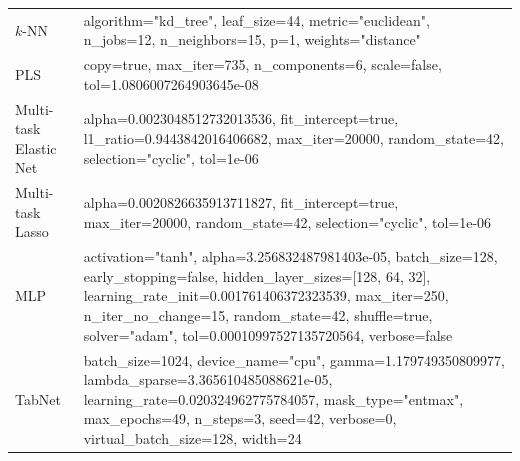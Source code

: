 \begin{longtable}{p{3.2cm}p{11.5cm}}
$k$-NN & algorithm="kd\_tree", leaf\_size=44, metric="euclidean", n\_jobs=12, n\_neighbors=15, p=1, weights="distance" \\
PLS & copy=true, max\_iter=735, n\_components=6, scale=false, tol=1.0806007264903645e-08 \\
Multi-task Elastic Net & alpha=0.0023048512732013536, fit\_intercept=true, l1\_ratio=0.9443842016406682, max\_iter=20000, random\_state=42, selection="cyclic", tol=1e-06 \\
Multi-task Lasso & alpha=0.0020826635913711827, fit\_intercept=true, max\_iter=20000, random\_state=42, selection="cyclic", tol=1e-06 \\
MLP & activation="tanh", alpha=3.256832487981403e-05, batch\_size=128, early\_stopping=false, hidden\_layer\_sizes=[128, 64, 32], learning\_rate\_init=0.001761406372323539, max\_iter=250, n\_iter\_no\_change=15, random\_state=42, shuffle=true, solver="adam", tol=0.00010997527135720564, verbose=false \\
TabNet & batch\_size=1024, device\_name="cpu", gamma=1.179749350809977, lambda\_sparse=3.365610485088621e-05, learning\_rate=0.020324962775784057, mask\_type="entmax", max\_epochs=49, n\_steps=3, seed=42, verbose=0, virtual\_batch\_size=128, width=24 \\
\end{longtable}
